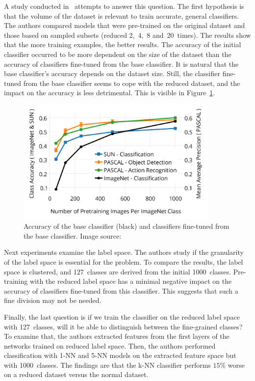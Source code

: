 \documentclass[a4paper,11pt,twoside]{report}
\theoremstyle{definition}
\begin{document}
\FloatBarrier

A study conducted in~\cite{imagnet} attempts to answer this question. The first hypothesis is that the volume of the dataset is relevant to train accurate, general classifiers. The authors compared models that were pre-trained on the original dataset and those based on sampled subsets (reduced 2,~4,~8 and~20~times). The results show that the more training examples, the better results. The accuracy of the initial classifier occurred to be more dependent on the size of the dataset than the accuracy of classifiers fine-tuned from the base classifier. It is natural that the base classifier's accuracy depends on the dataset size. Still, the classifier fine-tuned from the base classifier seems to cope with the reduced dataset, and the impact on the accuracy is less detrimental. This is visible in Figure~\ref{fig:size_acc_img}.

\FloatBarrier


\begin{figure}[h!]
\centering
\includegraphics[width=10cm]{imgs/imagenet_instances_accuracy.png}
\caption{Accuracy of the base classifier (black) and classifiers fine-tuned from the base classifier. Image source:~\cite{imagnet}}
\label{fig:size_acc_img}
\end{figure}
\FloatBarrier

Next experiments examine the label space. The authors study if the granularity of the label space is essential for the problem. To compare the results, the label space is clustered, and 127~classes are derived from the initial 1000~classes. Pre-training with the reduced label space has a minimal negative impact on the accuracy of classifiers fine-tuned from this classifier. This suggests that such a fine division may not be needed.

Finally, the last question is if we train the classifier on the reduced label space with 127~classes, will it be able to distinguish between the fine-grained classes? To examine that, the authors extracted features from the first layers of the networks trained on reduced label space. Then, the authors performed classification with 1-NN and 5-NN models on the extracted feature space but with 1000~classes. The findings are that the k-NN classifier performs $15\%$ worse on a reduced dataset versus the normal dataset.
\end{document}
